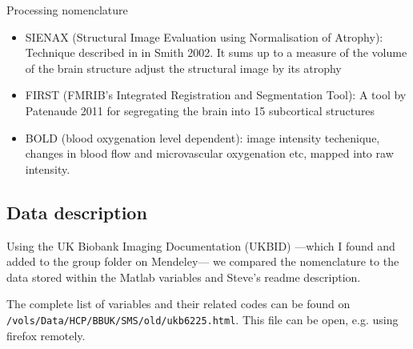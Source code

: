 \documentclass{article}
\begin{document}
Processing nomenclature
\begin{itemize}
\item SIENAX (Structural Image Evaluation using Normalisation of Atrophy): Technique described in in Smith 2002. It sums up to a measure of the volume of the brain structure adjust the structural image by its atrophy 
  \item FIRST (FMRIB's Integrated Registration and Segmentation Tool): A tool by Patenaude 2011 for segregating the brain into 15 subcortical structures
  \item BOLD (blood oxygenation level dependent):  image intensity techenique, changes in blood flow and microvascular oxygenation etc, mapped into raw intensity.
\end{itemize}

\subsection{Data description\label{data}}

Using the UK Biobank Imaging Documentation (UKBID) ---which I found and added to the group folder on Mendeley--- we compared the nomenclature to the data stored within the Matlab variables and Steve's readme description.

The complete list of variables and their related codes can be found on {\tt /vols/Data/HCP/BBUK/SMS/old/ukb6225.html}. This file can be open, e.g. using firefox remotely.
\end{document}
